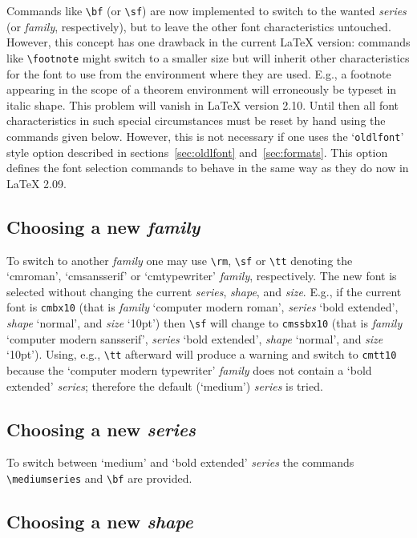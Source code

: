  Commands like \verb+\bf+ (or \verb+\sf+) are now implemented to
 switch to the wanted {\em series\/} (or {\em family}, respectively),
 but to leave
 the other font characteristics untouched.  However, this concept has
 one drawback in the current \LaTeX{} version: commands like
 \verb+\footnote+ might switch to a smaller size but will inherit
 other characteristics for the font to use from the environment where
 they are used.  E.g., a footnote appearing in the scope of a theorem
 environment will erroneously be typeset in italic shape.  This
 problem will vanish in \LaTeX{} version 2.10.  Until then all font
 characteristics in such special circumstances must be reset by hand
 using the commands given below.  However, this is not necessary if
 one uses the `{\tt oldlfont}' style option described in
 sections~\ref{sec:oldlfont} and~\ref{sec:formats}.
 This option defines the font selection
 commands to behave in the same way as they do now in \LaTeX{} 2.09.


 \subsection{Choosing a new {\em family}}

 To switch to another {\em family\/} one may use \verb+\rm+,
 \verb+\sf+ or \verb+\tt+ denoting the `cmroman', `cmsansserif' or
 `cmtypewriter' {\em family}, respectively.  The new font is selected
 without changing the current {\em series}, {\em shape}, and {\em
 size}.  E.g., if the current font is {\tt cmbx10} (that is {\em
 family\/} `computer modern roman', {\em series\/} `bold extended',
 {\em shape\/} `normal', and {\em size\/} `10pt') then \verb+\sf+ will
 change to {\tt cmssbx10} (that is {\em family\/} `computer modern
 sansserif', {\em series\/} `bold extended', {\em shape\/} `normal', and
 {\em size\/} `10pt').  Using, e.g., \verb+\tt+ afterward will
 produce a warning and switch to {\tt cmtt10} because the `computer
 modern typewriter' {\em family\/} does not contain a `bold extended'
 {\em series}; therefore the default (`medium') {\em series\/} is tried.

 \subsection{Choosing a new {\em series}}

 To switch between `medium' and `bold extended' {\em series\/} the
 commands \verb+\mediumseries+ and \verb+\bf+ are provided.

 \subsection{Choosing a new {\em shape}}

